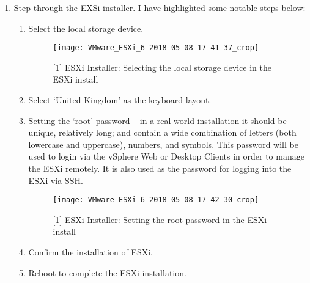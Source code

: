 \begin{enumerate}[resume*=task1methodology]
  \item Step through the EXSi installer. I have highlighted some notable steps below:
    \begin{enumerate}[label=(\alph*)]
      \item Select the local storage device.
        \begin{figure}[H]
          \centering
          \captionsetup{skip=2pt}
          \texttt{[image: VMware\_ESXi\_6-2018-05-08-17-41-37\_crop]}
          \caption{[1] ESXi Installer: Selecting the local storage device in the ESXi install}
          \label{fig:task1:esxiinstall_01}
        \end{figure}
      \item Select `United Kingdom' as the keyboard layout.
      \item Setting the `root' password -- in a real-world installation it should be unique, relatively long; and contain a wide combination of letters (both lowercase and uppercase), numbers, and symbols. This password will be used to login via the vSphere Web or Desktop Clients in order to manage the ESXi remotely. It is also used as the password for logging into the ESXi via SSH.
        \begin{figure}[H]
          \centering
          \captionsetup{skip=2pt}
          \texttt{[image: VMware\_ESXi\_6-2018-05-08-17-42-30\_crop]}
          \caption{[1] ESXi Installer: Setting the root password in the ESXi install}
          \label{fig:task1:esxiinstall_03}
        \end{figure}
      \item Confirm the installation of ESXi.
      \item Reboot to complete the ESXi installation.

\end{enumerate}
\end{enumerate}
